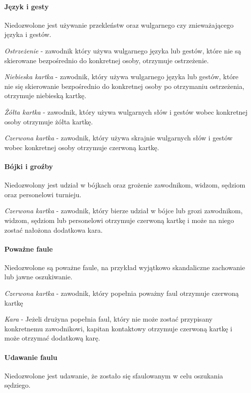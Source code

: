 \documentclass[12pt]{article}
\begin{document}
\paragraph{Język i gesty}
Niedozwolone jest używanie przekleństw
oraz wulgarnego czy znieważającego języka i gestów.

\emph{Ostrzeżenie} - zawodnik który używa wulgarnego języka lub gestów,
które nie są skierowane bezpośrednio do konkretnej osoby, otrzymuje
ostrzeżenie.

\emph{Niebieska kartka} - zawodnik, który używa wulgarnego języka lub
gestów, które nie się skierowanie bezpośrednio do konkretnej osoby po
otrzymaniu ostrzeżenia, otrzymuje niebieską kartkę.

\emph{Żółta kartka} - zawodnik, który używa wulgarnych słów i gestów
wobec konkretnej osoby otrzymuje żółta kartkę.

\emph{Czerwona kartka} - zawodnik, który używa skrajnie wulgarnych słów
i gestów wobec konkretnej osoby otrzymuje czerwoną kartkę.

\paragraph{Bójki i groźby}
Niedozwolony jest udział w bójkach
oraz grożenie zawodnikom, widzom, sędziom oraz personelowi turnieju.

\emph{Czerwona kartka} - zawodnik, który bierze udział w bójce lub grozi
zawodnikom, widzom, sędziom lub personelowi otrzymuje czerwoną kartkę i
może na niego zostać nałożona dodatkowa kara.

\paragraph{Poważne faule}
Niedozwolone są poważne faule, na
przykład wyjątkowo skandaliczne zachowanie lub jawne oszukiwanie.

\emph{Czerwona kartka} - zawodnik, który popełnia poważny faul otrzymuje
czerwoną kartkę

\emph{Kara} - Jeżeli drużyna popełnia faul, który nie może zostać
przypisany konkretnemu zawodnikowi, kapitan kontaktowy otrzymuje
czerwoną kartkę i może otrzymać dodatkową karę.

\paragraph{Udawanie faulu}
Niedozwolone jest udawanie, że
zostało się sfaulowanym w celu oszukania sędziego.
\end{document}
